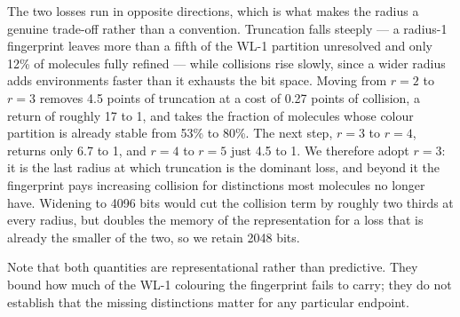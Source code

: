 The two losses run in opposite directions, which is what makes the radius a genuine trade-off
rather than a convention. Truncation falls steeply --- a radius-1 fingerprint leaves more than a
fifth of the WL-1 partition unresolved and only 12\% of molecules fully refined --- while
collisions rise slowly, since a wider radius adds environments faster than it exhausts the bit
space. Moving from $r = 2$ to $r = 3$ removes 4.5 points of truncation at a cost of 0.27 points
of collision, a return of roughly 17 to 1, and takes the fraction of molecules whose colour
partition is already stable from 53\% to 80\%. The next step, $r = 3$ to $r = 4$, returns only
6.7 to 1, and $r = 4$ to $r = 5$ just 4.5 to 1. We therefore adopt $r = 3$: it is the last radius
at which truncation is the dominant loss, and beyond it the fingerprint pays increasing collision
for distinctions most molecules no longer have. Widening to 4096 bits would cut the collision
term by roughly two thirds at every radius, but doubles the memory of the representation for a
loss that is already the smaller of the two, so we retain 2048 bits.

Note that both quantities are representational rather than predictive. They bound how much of the
WL-1 colouring the fingerprint fails to carry; they do not establish that the missing
distinctions matter for any particular endpoint.
